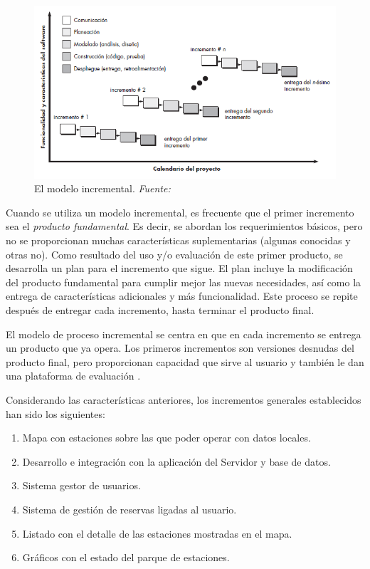 \begin{figure}
	\centering
	\includegraphics[width=\linewidth,height=\textheight,keepaspectratio]{Images/ModeloIncremental}
	\caption[El modelo incremental]{El modelo incremental. \textit{Fuente:~\cite{Pre10}}}
	\label{fig:procesoIncremental}
\end{figure}

Cuando se utiliza un modelo incremental, es frecuente que el primer incremento sea el \emph{producto fundamental}. Es decir, se abordan los requerimientos básicos, pero no se proporcionan muchas características suplementarias (algunas conocidas y otras no). Como resultado del uso y/o evaluación de este primer producto, se desarrolla un plan para el incremento que sigue. El plan incluye la modificación del producto fundamental para cumplir mejor las nuevas necesidades, así como la entrega de características adicionales y más funcionalidad. Este proceso se repite después de entregar cada incremento, hasta terminar el producto final.

El modelo de proceso incremental se centra en que en cada incremento se entrega un producto que ya opera. Los primeros incrementos son versiones desnudas del producto final, pero proporcionan capacidad que sirve al usuario y también le dan una plataforma de evaluación \cite{Pre10}.

Considerando las características anteriores, los incrementos generales establecidos han sido los siguientes:

\begin{enumerate}  
	\item Mapa con estaciones sobre las que poder operar con datos locales.
	\item Desarrollo e integración con la aplicación del Servidor y base de datos.
	\item Sistema gestor de usuarios.
	\item Sistema de gestión de reservas ligadas al usuario.
	\item Listado con el detalle de las estaciones mostradas en el mapa.
	\item Gráficos con el estado del parque de estaciones.
\end{enumerate}


